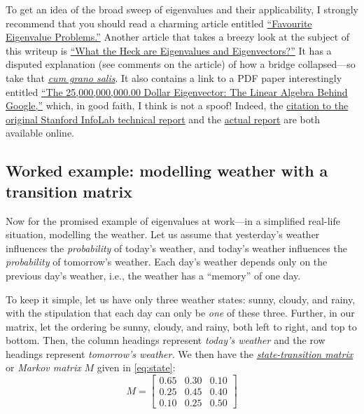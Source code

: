 \documentclass[
  11pt,
  a4paper,
]{article}
\begin{document}
To get an idea of the broad sweep of eigenvalues and their
applicability, I strongly recommend that you should read a charming
article entitled
\href{http://people.maths.ox.ac.uk/trefethen/dec11.pdf}{``Favourite
Eigenvalue Problems.''} Another article that takes a breezy look at the
subject of this writeup is
\href{http://hubpages.com/education/What-the-Heck-are-Eigenvalues-and-Eigenvectors}{``What
the Heck are Eigenvalues and Eigenvectors?''} It has a disputed
explanation (see comments on the article) of how a bridge collapsed---so
take that
\href{https://www.thefreedictionary.com/cum+grano+salis}{\emph{cum grano
salis}}. It also contains a link to a PDF paper interestingly entitled
\href{http://www.rose-hulman.edu/~bryan/googleFinalVersionFixed.pdf}{``The
25,000,000,000.00 Dollar Eigenvector: The Linear Algebra Behind
Google,''} which, in good faith, I think is not a spoof! Indeed, the
\href{http://ilpubs.stanford.edu:8090/422/}{citation to the original
Stanford InfoLab technical report} and the
\href{http://ilpubs.stanford.edu:8090/422/1/1999-66.pdf}{actual report}
are both available online.

\hypertarget{worked-example-modelling-weather-with-a-transition-matrix}{%
\subsection{Worked example: modelling weather with a transition
matrix}\label{worked-example-modelling-weather-with-a-transition-matrix}}

Now for the promised example of eigenvalues at work---in a simplified
real-life situation, modelling the weather. Let us assume that
yesterday's weather influences the \emph{probability} of today's
weather, and today's weather influences the \emph{probability} of
tomorrow's weather. Each day's weather depends only on the previous
day's weather, i.e., the weather has a ``memory'' of one day.

To keep it simple, let us have only three weather states: sunny, cloudy,
and rainy, with the stipulation that each day can only be \emph{one} of
these three. Further, in our matrix, let the ordering be sunny, cloudy,
and rainy, both left to right, and top to bottom. Then, the column
headings represent \emph{today's weather} and the row headings represent
\emph{tomorrow's weather.} We then have the
\href{https://en.wikipedia.org/wiki/Stochastic_matrix}{\emph{state-transition
matrix}} or \emph{Markov matrix} \(M\) given in \cref{eq:state}:
\begin{equation}
M = \begin{bmatrix}
0.65 & 0.30 & 0.10\\
0.25 & 0.45 & 0.40\\
0.10 & 0.25 & 0.50
\end{bmatrix}
\label{eq:state}\end{equation}
\end{document}
